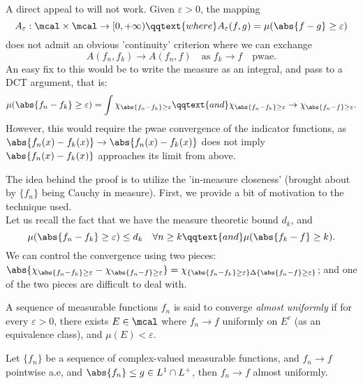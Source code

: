 \documentclass[../../main.tex]{subfiles}
\begin{document}
\begin{remark}
    \begin{note}
        A direct appeal to  will not work. Given $\varepsilon>0$, the mapping 
        \[A_\varepsilon: \mcal\times\mcal\to [0,+\infty)\qqtext{where} A_\varepsilon(f,g) = \mu(\abs{f-g}\geq \varepsilon)\] 
        does not admit an obvious 'continuity' criterion where we can exchange
        \[
            A(f_n, f_k)\to A(f_n,f)\quad\text{as }f_k\to f\quad \text{pwae.}
        \]
        An easy fix to this would be to write the measure as an integral, and pass to a DCT argument, that is: 
        \[\mu(\abs{f_n - f_k}\geq \varepsilon) = \int \chi_{\abs{f_n - f_k}\geq \varepsilon}\qqtext{and}\chi_{\abs{f_n - f_k}\geq\varepsilon}\to \chi_{\abs{f_n - f}\geq \varepsilon}.
        \]
        However, this would require the pwae convergence of the indicator functions, as $\abs{f_n(x)-f_k(x)}\to \abs{f_n(x) - f_k(x)}$ does not imply $\abs{f_n(x)-f_k(x)}$ approaches its limit from above.
    \end{note}
    \begin{note}
        The idea behind the proof is to utilize the 'in-measure closeness' (brought about by $\{f_n\}$ being Cauchy in measure). First, we provide a bit of motivation to the technique used. \\
    
        Let us recall the fact that we have the measure theoretic bound $d_k$, and
        \[
            \mu(\abs{f_n - f_k}\geq \varepsilon)\leq d_k\quad\forall n\geq k\qqtext{and}\mu(\abs{f_k - f}\geq k).
        \]
        We can control the convergence using two pieces: $\abs{\chi_{\abs{f_n - f_k}\geq\varepsilon} - \chi_{\abs{f_n - f}\geq\varepsilon}} = \chi_{\{\abs{f_n - f_k}\geq\varepsilon\} \Delta \{\abs{f_n - f}\geq \varepsilon\}}$; and one of the two pieces are difficult to deal with.
    \end{note}
\end{remark}
\begin{definition}
    A sequence of measurable functions $f_n$ is said to converge \emph{almost uniformly} if for every $\varepsilon>0$, there exists $E\in\mcal$ where $f_n\to f$ uniformly on $E^c$ (as an equivalence class), and $\mu(E)<\varepsilon$.
\end{definition}
\begin{wts}
    Let $\{f_n\}$ be a sequence of complex-valued measurable functions, and $f_n\to f$ pointwise a.e, and $\abs{f_n}\leq g\in L^1\cap L^+$, then $f_n\to f$ almost uniformly.
\end{wts}
\end{document}
